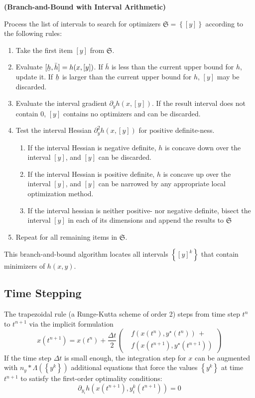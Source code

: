 \documentclass[twoside,leqno,twocolumn]{article}
\newcommand{\frS}{\ensuremath{\mathfrak{S}}}
\newcommand\ubar[1]{\underaccent{\bar}{#1}}
\begin{document}
\begin{algorithm}
	\label{algo:bnb-ia}
	\textbf{(Branch-and-Bound with Interval Arithmetic)}
	
	Process the list of intervals to search for optimizers $\frS = \left\{[y]\right\}$ according to the following rules:
	\begin{enumerate} 
		\item Take the first item $[y]$ from $\frS$.
		\item Evaluate $[\ubar h, \bar h] = h(x, [y])$. If $\bar h$ is less than the current upper bound for $h$, update it. If $\ubar h$ is larger than the current upper bound for $h$, $[y]$ may be discarded.
		\item Evaluate the interval gradient $\partial_y h(x, [y])$. If the result interval does not contain $0$, $[y]$ contains no optimizers and can be discarded.
		\item Test the interval Hessian $\partial^2_y h(x, [y])$ for positive definite-ness.
		\begin{enumerate}
			\item If the interval Hessian is negative definite, $h$ is concave down over the interval $[y]$, and $[y]$ can be discarded.
			\item If the interval Hessian is positive definite, $h$ is concave up over the interval $[y]$, and $[y]$ can be narrowed by any appropriate local optimization method.
			\item If the interval hessian is neither positive- nor negative definite, bisect the interval $[y]$ in each of its dimensions and append the results to $\frS$
		\end{enumerate}
		\item Repeat for all remaining items in $\frS$.
	\end{enumerate}
\end{algorithm}
This branch-and-bound algorithm locates all intervals $\left\{[y]^k\right\}$ that contain minimizers of $h(x, y)$.

\subsection{Time Stepping}
The trapezoidal rule (a Runge-Kutta scheme of order 2) steps from time step $t^n$ to $t^{n+1}$ via the implicit formulation
\begin{equation}
	\label{eq:trap-rule}
	x(t^{n+1}) = x(t^n) + \frac{\Delta t}{2}\left(\begin{aligned}&f\left(x(t^n), y^\star(t^n)\right)\, + \\ &f\left(x(t^{n+1}), y^\star(t^{n+1})\right) \end{aligned}\right)
\end{equation}
If the time step $\Delta t$ is small enough, the integration step for $x$ can be augmented with $n_y * \Lambda\left(\left\{y^k\right\}\right)$ additional equations that force the values $\left\{y^k\right\}$ at time $t^{n+1}$ to satisfy the first-order optimality conditions:
\begin{equation}
	\label{eq:first-order-opt-at-tn}
	\partial_{y_i}h\left(x(t^{n+1}), y^k_i(t^{n+1})\right) = 0
\end{equation}
	
\end{document}
